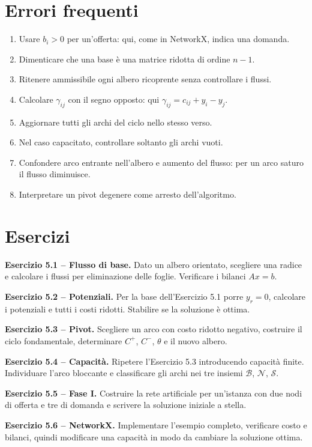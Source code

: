 \documentclass[11pt,a4paper]{article}
\newcommand{\Bset}{\mathcal{B}}
\newcommand{\Nset}{\mathcal{N}}
\newcommand{\Sset}{\mathcal{S}}
\begin{document}
\section{Errori frequenti}
\begin{enumerate}
\item Usare $b_i>0$ per un'offerta: qui, come in NetworkX, indica una domanda.
\item Dimenticare che una base è una matrice ridotta di ordine $n-1$.
\item Ritenere ammissibile ogni albero ricoprente senza controllare i flussi.
\item Calcolare $\gamma_{ij}$ con il segno opposto: qui $\gamma_{ij}=c_{ij}+y_i-y_j$.
\item Aggiornare tutti gli archi del ciclo nello stesso verso.
\item Nel caso capacitato, controllare soltanto gli archi vuoti.
\item Confondere arco entrante nell'albero e aumento del flusso: per un arco saturo il flusso diminuisce.
\item Interpretare un pivot degenere come arresto dell'algoritmo.
\end{enumerate}

\section{Esercizi}

\textbf{Esercizio 5.1 -- Flusso di base.}
Dato un albero orientato, scegliere una radice e calcolare i flussi per eliminazione delle foglie. Verificare i bilanci $Ax=b$.

\medskip\textbf{Esercizio 5.2 -- Potenziali.}
Per la base dell'Esercizio 5.1 porre $y_r=0$, calcolare i potenziali e tutti i costi ridotti. Stabilire se la soluzione è ottima.

\medskip\textbf{Esercizio 5.3 -- Pivot.}
Scegliere un arco con costo ridotto negativo, costruire il ciclo fondamentale, determinare $C^+$, $C^-$, $\theta$ e il nuovo albero.

\medskip\textbf{Esercizio 5.4 -- Capacità.}
Ripetere l'Esercizio 5.3 introducendo capacità finite. Individuare l'arco bloccante e classificare gli archi nei tre insiemi $\Bset$, $\Nset$, $\Sset$.

\medskip\textbf{Esercizio 5.5 -- Fase I.}
Costruire la rete artificiale per un'istanza con due nodi di offerta e tre di domanda e scrivere la soluzione iniziale a stella.

\medskip\textbf{Esercizio 5.6 -- NetworkX.}
Implementare l'esempio completo, verificare costo e bilanci, quindi modificare una capacità in modo da cambiare la soluzione ottima.
\end{document}
